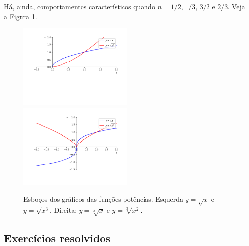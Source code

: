 Há, ainda, comportamentos característicos quando $n=1/2$, $1/3$, $3/2$ e $2/3$. Veja a Figura \ref{fig:funpot_racional}.

\begin{figure}[H]
  \centering
  \includegraphics[width=0.5\textwidth]{./cap_funcao/dados/fig_funpot_racional/fig_funpot_racional_par}~
    \includegraphics[width=0.5\textwidth]{./cap_funcao/dados/fig_funpot_racional/fig_funpot_racional_impar}
  \caption{Esboços dos gráficos das funções potências. Esquerda $y=\sqrt{x}$ e $y=\sqrt{x^3}$. Direita: $y=\sqrt[3]{x}$ e $y=\sqrt[3]{x^2}$.}
  \label{fig:funpot_racional}
\end{figure}


\subsection*{Exercícios resolvidos}

